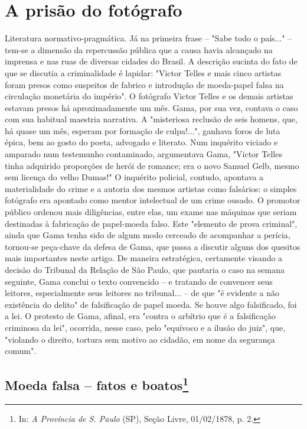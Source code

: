\part{A prisão do fotógrafo}

\pagebreak
\mbox{}\vfill
\thispagestyle{empty}

{\small\noindent
Literatura normativo-pragmática. Já na primeira frase -- "Sabe
todo o país..." -- tem-se a dimensão da repercussão pública que a causa
havia alcançado na imprensa e nas ruas de diversas cidades do Brasil. A
descrição sucinta do fato de que se discutia a criminalidade é lapidar:
"Victor Telles e mais cinco artistas foram presos como suspeitos de
fabrico e introdução de moeda-papel falsa na circulação monetária do
império". O fotógrafo Victor Telles e os demais artistas estavam presos
há aproximadamente um mês. Gama, por sua vez, contava o caso com sua
habitual maestria narrativa. A "misteriosa reclusão de seis homens, que,
há quase um mês, esperam por formação de culpa!...", ganhava foros de
luta épica, bem ao gosto do poeta, advogado e literato. Num inquérito
viciado e amparado num testemunho contaminado, argumentava Gama, "Victor
Telles tinha adquirido proporções de herói de romance; era o novo Samuel
Gelb, mesmo sem licença do velho Dumas!" O inquérito policial, contudo,
apontava a materialidade do crime e a autoria dos mesmos artistas como
falsários: o simples fotógrafo era apontado como mentor intelectual de
um crime ousado. O promotor público ordenou mais diligências, entre
elas, um exame nas máquinas que seriam destinadas à fabricação de
papel-moeda falso. Este "elemento de prova criminal", ainda que Gama
tenha sido de algum modo cerceado de acompanhar a perícia, tornou-se
peça-chave da defesa de Gama, que passa a discutir alguns dos quesitos
mais importantes neste artigo. De maneira estratégica, certamente
visando a decisão do Tribunal da Relação de São Paulo, que pautaria o
caso na semana seguinte, Gama conclui o texto convencido -- e tratando
de convencer seus leitores, especialmente seus leitores no tribunal...
-- de que "é evidente a não existência do delito" de falsificação de
papel moeda. Se houve algo falsificado, foi a lei. O protesto de Gama,
afinal, era "contra o arbítrio que é a falsificação criminosa da lei",
ocorrida, nesse caso, pelo "equívoco e a ilusão do juiz", que, "violando
o direito, tortura sem motivo ao cidadão, em nome da segurança comum". }

\chapter{Moeda falsa -- fatos e boatos\footnote[*]{In: \emph{A
  Província de S. Paulo} (SP), Seção Livre, 01/02/1878, p. 2.}}


